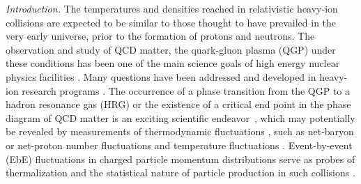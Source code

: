 \documentclass[aps,twocolumn,prd,superscriptaddress,nofootinbib,floatfix]{revtex4-2}
\begin{document}
\textit{Introduction.}\label{sec:introduction} The temperatures and densities reached in relativistic heavy-ion collisions are expected to be similar to those thought to have prevailed in the very early universe, prior to the formation of protons and neutrons. The observation and study of QCD matter, the quark-gluon plasma (QGP) under these conditions has been one of the main science goals of high energy nuclear physics facilities \cite{Shuryak:1980tp, Harris:1996zx, STAR:2005gfr, PHENIX:2004vcz, ALICE:2005vhb, Busza:2018rrf, STAR:2023jdd}. Many questions have been addressed and developed in heavy-ion research programs \cite{Busza:2018rrf}. The occurrence of a phase transition from the QGP to a hadron resonance gas (HRG) or the existence of a critical end point in the phase diagram of QCD matter is an exciting scientific endeavor~\cite{Stephanov:1998dy, Stephanov:1999zu, Fu:2019hdw, Gao:2020fbl, Gunkel:2021oya}, which may potentially be revealed by measurements of thermodynamic fluctuations \cite{STAR:2010vob, Bzdak:2019pkr, Chen:2024aom}, such as net-baryon or net-proton number fluctuations \cite{STAR:2020tga, STAR:2021fge, STAR:2022vlo,STAR:2022etb, STAR:2025zdq, Fu:2016tey, Fu:2021oaw, Fu:2023lcm, Lu:2025cls} and temperature fluctuations \cite{Gavin:2003cb,Cao:2021zhy}. Event-by-event (EbE) fluctuations in charged particle momentum distributions serve as probes of thermalization and the statistical nature of particle production in such collisions \cite{Heiselberg:2000fk, Jeon:2000wg, Voloshin:1999yf, Asakawa:2000wh,Stodolsky:1995ds}.  
\end{document}
